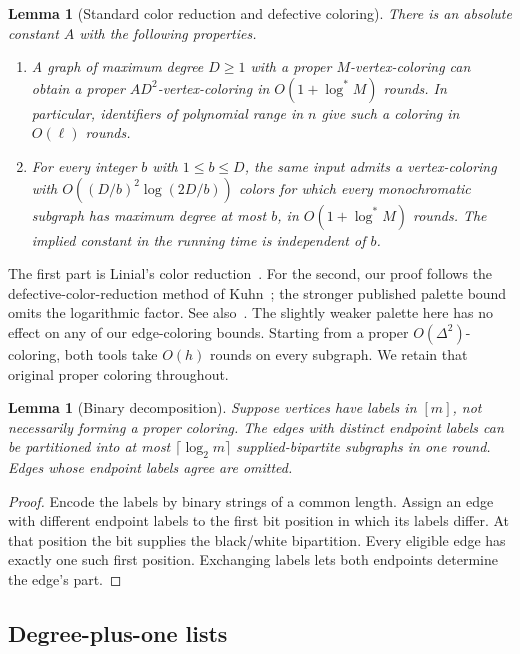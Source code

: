 \documentclass[11pt]{article}
\newtheorem{lemma}[theorem]{Lemma}
\theoremstyle{definition}
\theoremstyle{remark}
\begin{document}
\begin{lemma}[Standard color reduction and defective coloring]
\label{lem:standarddefect}
There is an absolute constant $A$ with the following properties.
\begin{enumerate}
\item A graph of maximum degree $D\ge1$ with a proper $M$-vertex-coloring
can obtain a proper $A D^2$-vertex-coloring in $O(1+\log^*M)$ rounds.
In particular, identifiers of polynomial range in $n$ give such a
coloring in $O(\ell)$ rounds.
\item For every integer $b$ with $1\le b\le D$, the same input admits
a vertex-coloring with $O((D/b)^2\log(2D/b))$ colors for which every
monochromatic subgraph has maximum degree at most $b$, in
$O(1+\log^*M)$ rounds.  The implied constant in the running time is
independent of $b$.
\end{enumerate}
\end{lemma}

The first part is Linial's color reduction~\cite{Linial}. For the
second, our proof follows the defective-color-reduction method of
Kuhn~\cite{Kuhn}; the stronger published palette bound omits the
logarithmic factor. See also~\cite{BEK}. The slightly weaker palette
here has no effect on any of our edge-coloring bounds. Starting from a
proper $O(\Delta^2)$-coloring, both tools take $O(h)$ rounds on every
subgraph. We retain that original proper coloring throughout.

\begin{lemma}[Binary decomposition]\label{lem:binarydecomposition}
Suppose vertices have labels in $[m]$, not necessarily forming a proper
coloring.  The edges with distinct endpoint labels can be partitioned
into at most $\lceil\log_2m\rceil$ supplied-bipartite subgraphs in one
round.  Edges whose endpoint labels agree are omitted.
\end{lemma}

\begin{proof}
Encode the labels by binary strings of a common length.  Assign an edge
with different endpoint labels to the first bit position in which its
labels differ.  At that position the bit supplies the black/white
bipartition.  Every eligible edge has exactly one such first position.
Exchanging labels lets both endpoints determine the edge's part.
\end{proof}

\subsection{Degree-plus-one lists}
\end{document}
